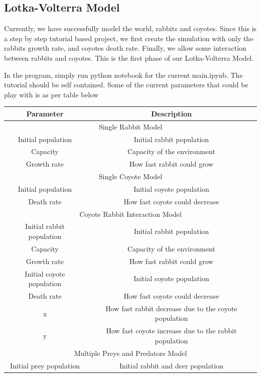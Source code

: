 \documentclass{article}
\begin{document}
\begin{normalsize}
		\subsection{Lotka-Volterra Model}
		Currently, we have successfully model the world, rabbits and coyotes. Since this is a step by step tutorial based project, we first create the simulation with only the rabbits growth rate, and coyotes death rate. Finally, we allow some interaction between rabbits and coyotes. This is the first phase of our Lotka-Volterra Model.
		
		In the program, simply run python notebook for the current main.ipynb. The tutorial should be self contained. Some of the current parameters that could be play with is as per table below
		
	\begin{center}
		\begin{tabular}{ |c|c|} 
			\hline
			Parameter & Description  \\ 
			\hline
			\multicolumn{2}{|c|}{Single Rabbit Model} \\
			\hline
			Initial population & Initial rabbit population \\ 
			Capacity & Capacity of the environment\\ 
			Growth rate & How fast rabbit could grow \\ 
			\hline
			\multicolumn{2}{|c|}{Single Coyote Model} \\
			\hline
			Initial population & Initial coyote population \\ 
			Death rate & How fast coyote could decrease \\ 
			\hline
			\multicolumn{2}{|c|}{Coyote Rabbit Interaction Model} \\
			\hline
			Initial rabbit population & Initial rabbit population  \\ 
			Capacity & Capacity of the environment\\ 
			Growth rate & How fast rabbit could grow \\ 
			Initial coyote population & Initial coyote population \\ 
			Death rate & How fast coyote could decrease \\ 
			x & How fast rabbit decrease due to the coyote population \\
			y & How fast coyote increase due to the rabbit population \\
			\hline
			\multicolumn{2}{|c|}{Multiple Preys and Predators Model} \\
			\hline
			Initial prey population & Initial rabbit and deer population \\ 

\end{tabular}
\end{center}
\end{normalsize}
\end{document}
